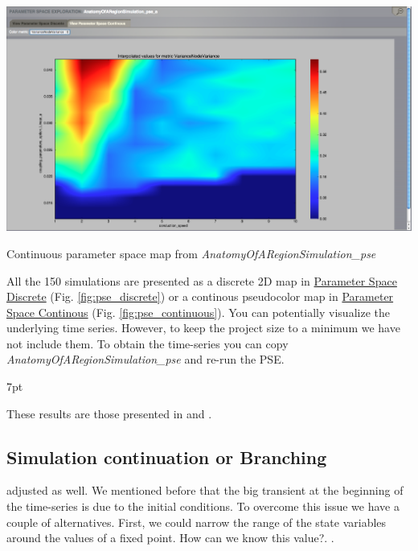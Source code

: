 \documentclass{tufte-handout}
\newenvironment{blah}{%
  \def\FrameCommand{%
    \hspace{1pt}%
    {\color{DarkOrange}\vrule width 2pt}%
    {\color{PeachPuff}\vrule width 4pt}%
    \colorbox{PeachPuff}%
  }%
  \MakeFramed{\advance\hsize-\width\FrameRestore}%
  \noindent\hspace{-4.55pt}%
  \begin{adjustwidth}{}{7pt}%
  \vspace{2pt}\vspace{2pt}%
}
{%
  \vspace{2pt}\end{adjustwidth}\endMakeFramed%
}
\begin{document}
\begin{marginfigure}
  \includegraphics[width=\linewidth]{Handout_UI_BuildingYourOwnBrainNetworkModel_PSEContinuous}%
  \caption{Continuous parameter space map from \textit{AnatomyOfARegionSimulation\_pse}}%
  \label{fig:pse_continuous}%
\end{marginfigure}

All the 150 simulations are presented as a discrete 2D map in
\underline{Parameter Space Discrete}  (Fig. \ref{fig:pse_discrete}) or a continous pseudocolor map in
\underline{Parameter Space Continous} (Fig. \ref{fig:pse_continuous}). 
You can potentially visualize the underlying time series. However, to keep the project size to a minimum we have not include them.
To obtain the time-series you can copy \textit{AnatomyOfARegionSimulation\_pse} and re-run the PSE.


\begin{blah}
These results are those presented in \citep{Ghosh_2008} and \citep{Knock_2009}. 
\end{blah}

\subsection{Simulation continuation or Branching}\label{sec:results}

adjusted as well. We mentioned before that the big transient at the beginning
of the time-series is due to the initial conditions. To overcome this issue we
have a couple of alternatives. First, we could narrow the range of the state
variables around the values of a fixed point. How can we know this value?.
.
\end{document}
